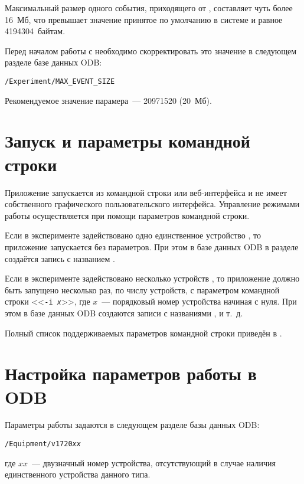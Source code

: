 Максимальный размер одного события, приходящего от \DEVICE{}, составляет чуть более 16~Мб, что превышает значение принятое по умолчанию в системе \MIDAS{} и равное 4194304~байтам.

Перед началом работы с \FE{} необходимо скорректировать это значение в следующем разделе базе данных ODB:

\medskip
{\tt /Experiment/MAX\_EVENT\_SIZE}
\medskip

Рекомендуемое значение парамера~--- 20971520 (20~Мб).

\section{Запуск и параметры командной строки}

Приложение \FE{} запускается из командной строки или веб-ин\-тер\-фейса \MIDAS{} \cite{MidasWikiMhttpd} и не имеет собственного графического пользовательского интерфейса. Управление режимами работы осуществляется при помощи параметров командной строки.

Если в эксперименте задействовано одно единственное устройство \DEVICE{}, то приложение \FE{} запускается без параметров. При этом в базе данных ODB в разделе  \cite{MidasWikiEquipment} создаётся запись с названием .

Если в эксперименте задействовано несколько устройств \DEVICE{}, то приложение \FE{} должно быть запущено несколько раз, по числу устройств, с параметром командной строки <<{\tt -i {\it x}}>>, где $x$~--- порядковый номер устройства начиная с нуля. При этом в базе данных ODB создаются записи с названиями ,  и т.~д.

Полный список поддерживаемых параметров командной строки приведён в \cite{MidasWikiFrontend}. 

\section{Настройка параметров работы в ODB}

Параметры работы \DEVICE{} задаются в следующем разделе базы данных ODB:

\medskip

{\tt /Equipment/v1720{\it xx}}

\medskip

\noindent где $xx$~--- двузначный номер устройства, отсутствующий в случае наличия единственного устройства данного типа.

